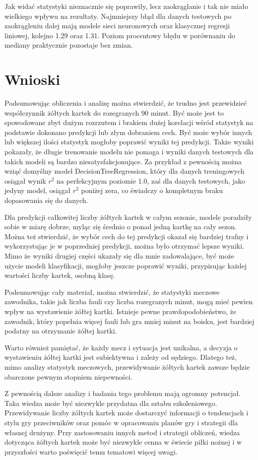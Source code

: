 \documentclass{article}
\begin{document}
Jak widać statystyki nieznacznie się poprawiły, lecz zaokrąglanie i tak nie miało wielkiego wpływu na rezultaty. Najmniejszy błąd dla danych testowych po zaokrągleniu dalej mają modele sieci neuronowych oraz klasycznej regresji liniowej, kolejno 1.29 oraz 1.31. Poziom procentowy błędu w porównaniu do mediany praktycznie pozostaje bez zmian.

\newpage
\section{Wnioski}
Podsumowując obliczenia i analizę można stwierdzić, że trudno jest przewidzieć współczynnik żółtych kartek do rozegranych 90 minut. Być może jest to spowodowane zbyt dużym rozrzutem i brakiem dużej korelacji wśród statystyk na podstawie dokonano predykcji lub złym dobraniem cech. Być może wybór innych lub większej ilości statystyk mogłoby poprawić wyniki tej predykcji. Także wyniki pokazały, że długie trenowanie modelu nie pomaga i wyniki danych testowych dla takich modeli są bardzo niesatysfakcjonujące. Za przykład z pewnością można wziąć domyślny model DecisionTreeRegression, który dla danych treningowych osiągał wynik $r^2$ na perfekcyjnym poziomie 1.0, zaś dla danych testowych, jako jedyny model, osiągał $r^2$ poniżej zera, co świadczy o kompletnym braku dopasowania się do danych.

Dla predykcji całkowitej liczby żółtych kartek w całym sezonie, modele poradziły sobie w miarę dobrze, myląc się średnio o ponad jedną kartkę na cały sezon. Można też stwierdzić, że wybór cech do tej predykcji okazał się bardziej trafny i wykorzystując je w poprzedniej predykcji, można było otrzymać lepsze wyniki. Mimo że wyniki drugiej części ukazały się dla mnie zadowalające, być może użycie modeli klasyfikacji, mogłoby jeszcze poprawić wyniki, przypisując każdej wartości liczby kartek, osobną klasę.   

\vspace{0.5cm}
Podsumowując cały materiał, można stwierdzić, że statystyki meczowe zawodnika, takie jak liczba fauli czy liczba rozegranych minut, mogą mieć pewien wpływ na wystawienie żółtej kartki. Istnieje pewne prawdopodobieństwo, że zawodnik, który popełnia więcej fauli lub gra mniej minut na boisku, jest bardziej podatny na otrzymanie żółtej kartki.

Warto również pamiętać, że każdy mecz i sytuacja jest unikalna, a decyzja o wystawieniu żółtej kartki jest subiektywna i zależy od sędziego. Dlatego też, mimo analizy statystyk meczowych, przewidywanie żółtych kartek zawsze będzie obarczone pewnym stopniem niepewności.

Z pewnością dalsze analizy i badania tego problemu mają ogromny potencjał. Taka wiedza może być
niezwykle przydatna dla sztabu szkoleniowego. Przewidywanie liczby żółtych kartek może dostarczyć
informacji o tendencjach i stylu gry przeciwników oraz pomóc w opracowaniu planów gry i strategii
dla własnej drużyny. Przy zastosowaniu innych metod i strategii obliczeń, wiedza dotycząca żółtych
kartek może być niezwykle cenna w świecie piłki nożnej i w przyszłości warto poświęcić temu tematowi
więcej uwagi.
\end{document}
